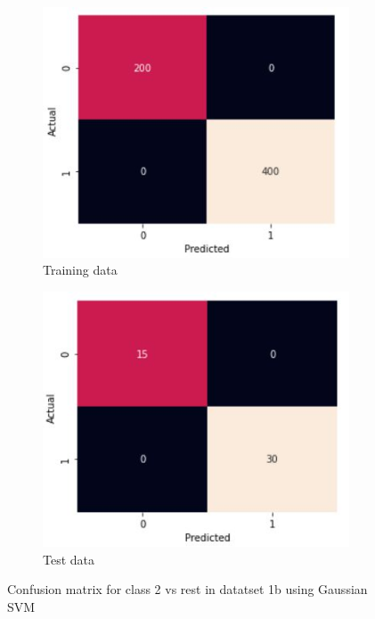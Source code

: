 \documentclass[11pt]{article}
\begin{document}
\newpage
\begin{figure}
\centering
	\begin{subfigure}[b]{0.45\textwidth}
	\centering
	\includegraphics[scale=0.5]{dataset1b_gauss_svm_2_cm_train.jpg}
	\caption{Training data}
	\label{fig:fig2.3.3.1}
	\end{subfigure}
	\begin{subfigure}[b]{0.45\textwidth}
	\centering
	\includegraphics[scale=0.5]{dataset1b_gauss_svm_2_cm_test.jpg}
	\caption{Test data}
	\label{fig:fig2.3.3.2}
	\end{subfigure}
\caption{Confusion matrix for class 2 vs rest in datatset 1b using Gaussian SVM}
\label{fig:fig2.3.3}
\end{figure}
\end{document}
